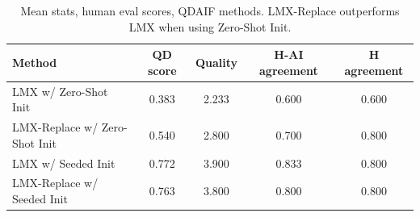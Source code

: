 \begin{table}[!t]
\caption{Mean stats, human eval scores, QDAIF methods. LMX-Replace outperforms LMX when using Zero-Shot Init.}
\vspace{0.4cm}
\label{table:mean_human_eval_qdaif}
\centering
\small
\begin{tabular}{lcccc}
\toprule
\textbf{Method} &
\textbf{QD score} & \textbf{Quality} & \textbf{H-AI agreement} & \textbf{H agreement }  \\
\midrule
LMX w/ Zero-Shot Init & 0.383 & 2.233 & 0.600 & 0.600  \\
LMX-Replace w/ Zero-Shot Init & 0.540 & 2.800 & 0.700 & 0.800  \\
\midrule
LMX w/ Seeded Init & 0.772 & 3.900 & 0.833 & 0.800  \\
LMX-Replace w/ Seeded Init & 0.763 & 3.800 & 0.800 & 0.800 \\
\bottomrule
\end{tabular}
\end{table}

